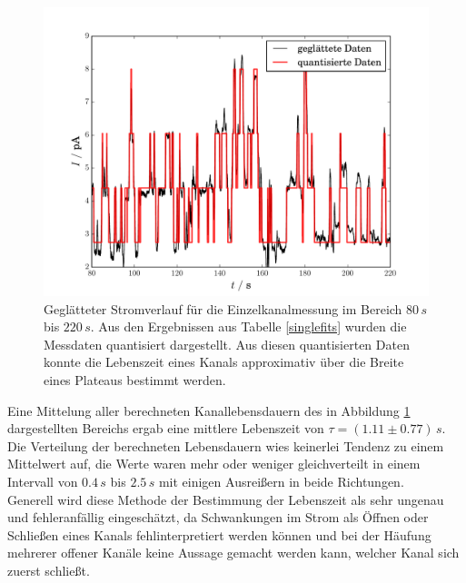 \documentclass{include/thesisclass3}
\newcommand{\e}[1]{\,\si{#1}}
\begin{document}
\begin{figure}[H]
\centering
\includegraphics[scale=0.7]{images/quantisierung.pdf}
\caption{Geglätteter Stromverlauf für die Einzelkanalmessung im Bereich $80\e{s}$ bis $220\e{s}$. Aus den  Ergebnissen aus Tabelle \ref{singlefits} wurden die Messdaten quantisiert dargestellt. Aus diesen quantisierten Daten konnte die Lebenszeit eines Kanals approximativ über die Breite eines Plateaus bestimmt werden.}
\label{quant}
\end{figure}
Eine Mittelung aller berechneten Kanallebensdauern des in Abbildung \ref{quant} dargestellten Bereichs ergab eine mittlere Lebenszeit von $\tau = (1.11\pm 0.77)\e{s}$.\\
Die Verteilung der berechneten Lebensdauern wies keinerlei Tendenz zu einem Mittelwert auf, die Werte waren mehr oder weniger gleichverteilt in einem Intervall von $0.4\e{s}$ bis $2.5\e{s}$ mit einigen Ausreißern in beide Richtungen.\\
Generell wird diese Methode der Bestimmung der Lebenszeit als sehr ungenau und fehleranfällig eingeschätzt, da Schwankungen im Strom als Öffnen oder Schließen eines Kanals fehlinterpretiert werden können und bei der Häufung mehrerer offener Kanäle keine Aussage gemacht werden kann, welcher Kanal sich zuerst schließt. 
\end{document}
